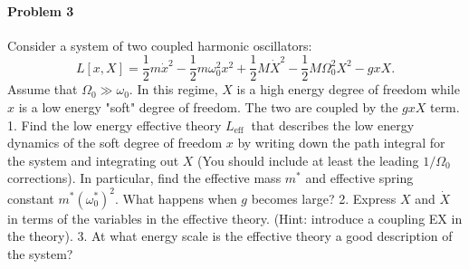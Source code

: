\documentclass[hyperref, a4paper]{article}
\begin{document}
\paragraph{Problem 3} Consider a system of two coupled harmonic oscillators:
$$
L[x, X]=\frac{1}{2} m \dot{x}^2-\frac{1}{2} m \omega_0^2 x^2+\frac{1}{2} M \dot{X}^2-\frac{1}{2} M \Omega_0^2 X^2-g x X .
$$
Assume that $\Omega_0 \gg \omega_0$. In this regime, $X$ is a high energy degree of freedom while $x$ is a low energy "soft" degree of freedom. The two are coupled by the $g x X$ term.
1. Find the low energy effective theory $L_{\text {eff }}$ that describes the low energy dynamics of the soft degree of freedom $x$ by writing down the path integral for the system and integrating out $X$ (You should include at least the leading $1 / \Omega_0$ corrections). In particular, find the effective mass $m^*$ and effective spring constant $m^*\left(\omega_0^*\right)^2$. What happens when $g$ becomes large?
2. Express $X$ and $\dot{X}$ in terms of the variables in the effective theory. (Hint: introduce a coupling EX in the theory).
3. At what energy scale is the effective theory a good description of the system?
\end{document}
